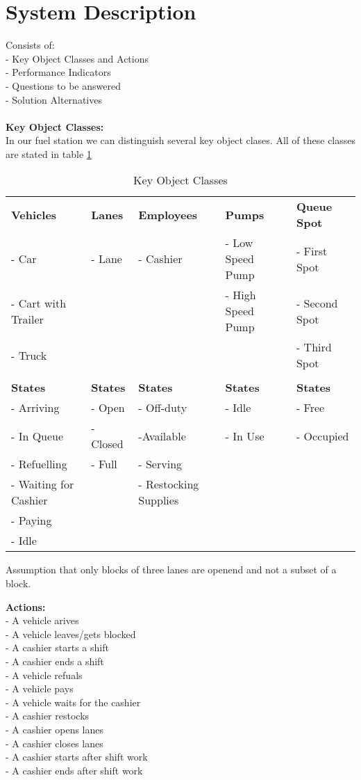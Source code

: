 \section{System Description}
Consists of:\\
- Key Object Classes and Actions\\
- Performance Indicators\\
- Questions to be answered\\
- Solution Alternatives \\
\\
\textbf{Key Object Classes:}\\
In our fuel station we can distinguish several key object clases. All of these classes are stated in table \ref{tab:koc}

\begin{center}
\begin{table}[h]
\begin{tabular}{| l | l | l | l | l |}
\hline
\textbf{Vehicles} & \textbf{Lanes} & \textbf{Employees} & \textbf{Pumps} & \textbf{Queue Spot}\\
- Car & - Lane & - Cashier& - Low Speed Pump & - First Spot\\
- Cart with Trailer & & & - High Speed Pump & - Second Spot\\
- Truck & & & & - Third Spot\\
& & & & \\
\textbf{States} & \textbf{States} & \textbf{States} & \textbf{States} & \textbf{States}\\
- Arriving & - Open & - Off-duty & - Idle & - Free\\
- In Queue & - Closed & -Available & - In Use & - Occupied\\
- Refuelling & - Full & - Serving & &\\
- Waiting for Cashier & & - Restocking Supplies & &\\
- Paying & & & &\\
- Idle & & & &\\
\hline
\end{tabular}
\caption{Key Object Classes}
\label{tab:koc}
\end{table}
\end{center}

Assumption that only blocks of three lanes are openend and not a subset of a block.

\textbf{Actions:}\\
- A vehicle arives\\
- A vehicle leaves/gets blocked\\
- A cashier starts a shift\\
- A cashier ends a shift\\
- A vehicle refuals\\
- A vehicle pays\\
- A vehicle waits for the cashier\\
- A cashier restocks\\
- A cashier opens lanes\\
- A cashier closes lanes\\
- A cashier starts after shift work\\
- A cashier ends after shift work\\


